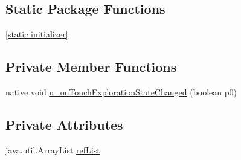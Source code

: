 \subsection*{Static Package Functions}
\begin{CompactItemize}
\item 
\hyperlink{classmono_1_1android_1_1support_1_1v4_1_1view_1_1accessibility_1_1_accessibility_manager_compat_9bd6a396809ffec70e161c1567d2a373_585d9778fcf9a0f907557dfbe3f3a267}{\mbox{[}static initializer\mbox{]}}
\end{CompactItemize}
\subsection*{Private Member Functions}
\begin{CompactItemize}
\item 
native void \hyperlink{classmono_1_1android_1_1support_1_1v4_1_1view_1_1accessibility_1_1_accessibility_manager_compat_9bd6a396809ffec70e161c1567d2a373_4abf51efe30f0d601160fb6b83f3e497}{n\_\-onTouchExplorationStateChanged} (boolean p0)
\end{CompactItemize}
\subsection*{Private Attributes}
\begin{CompactItemize}
\item 
java.util.ArrayList \hyperlink{classmono_1_1android_1_1support_1_1v4_1_1view_1_1accessibility_1_1_accessibility_manager_compat_9bd6a396809ffec70e161c1567d2a373_8361ba4e6736d75136a6ce56e524d944}{refList}
\end{CompactItemize}


